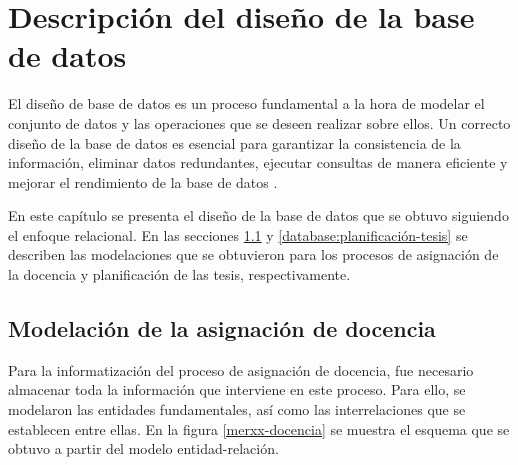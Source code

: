 \chapter{Descripción del diseño de la base de datos}\label{chapter:database}

El diseño de base de datos es un proceso fundamental a la hora 
de modelar el conjunto de datos y las operaciones que se deseen
realizar sobre ellos. Un correcto diseño de la base de datos
es esencial para garantizar la consistencia de la información,
eliminar datos redundantes, ejecutar consultas de manera 
eficiente y mejorar el rendimiento de la base de datos \cite{db_book_cap2}. 

En este capítulo se presenta el diseño de la base de datos que se 
obtuvo siguiendo el enfoque relacional.
En las secciones \ref{database:asignación-docencia} y
\ref{database:planificación-tesis} se describen las modelaciones que se obtuvieron 
para los procesos de asignación de la docencia y planificación de las tesis, respectivamente.






\section{Modelación de la asignación de docencia}\label{database:asignación-docencia}
Para la informatización del proceso de asignación de docencia, fue 
necesario almacenar toda la información que interviene en este proceso.
Para ello, se modelaron las entidades fundamentales, así como las interrelaciones
que se establecen entre ellas. En la figura \ref{merxx-docencia} se muestra el esquema que se obtuvo a partir 
del modelo entidad-relación.


